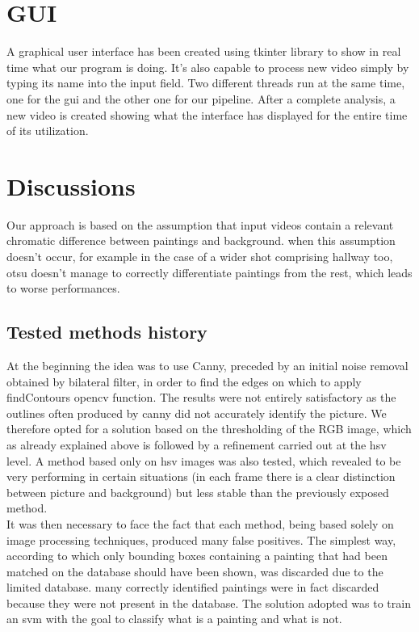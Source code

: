 \documentclass[conference]{IEEEtran}
\begin{document}
\bigskip
\bigskip
\bigskip


\section{GUI}
A graphical user interface has been created using tkinter library \cite{b12} to show in real time what our program is doing. It’s also capable to process new video simply by typing its name into the input field.
Two different threads run at the same time, one for the gui and the other one for our pipeline.
After a complete analysis, a new video is created showing what the interface has displayed for the entire time of its utilization.

\bigskip

\section{Discussions}
Our approach is based on the assumption that input videos contain a relevant chromatic difference between paintings and background. when this assumption doesn’t occur, for example in the case of a wider shot comprising hallway too, otsu doesn’t manage to correctly differentiate paintings from the rest, which leads to worse performances.
\subsection*{Tested methods history}
At the beginning the idea was to use Canny, preceded by an initial noise removal obtained by bilateral filter, in order to find the edges on which to apply findContours opencv function. The results were not entirely satisfactory as the outlines often produced by canny did not accurately identify the picture. We therefore opted for a solution based on the thresholding of the RGB image, which as already explained above is followed by a refinement carried out at the hsv level. A method based only on hsv images was also tested, which revealed to be very performing in certain situations (in each frame there is a clear distinction between picture and background) but less stable than the previously exposed method.\\
It was then necessary to face the fact that each method, being based solely on image processing techniques, produced many false positives. The simplest way, according to which only bounding boxes containing a painting that had been matched on the database should have been shown, was discarded due to the limited database. many correctly identified paintings were in fact discarded because they were not present in the database. The solution adopted was to train an svm with the goal to classify what is a painting and what is not.\\
\end{document}
